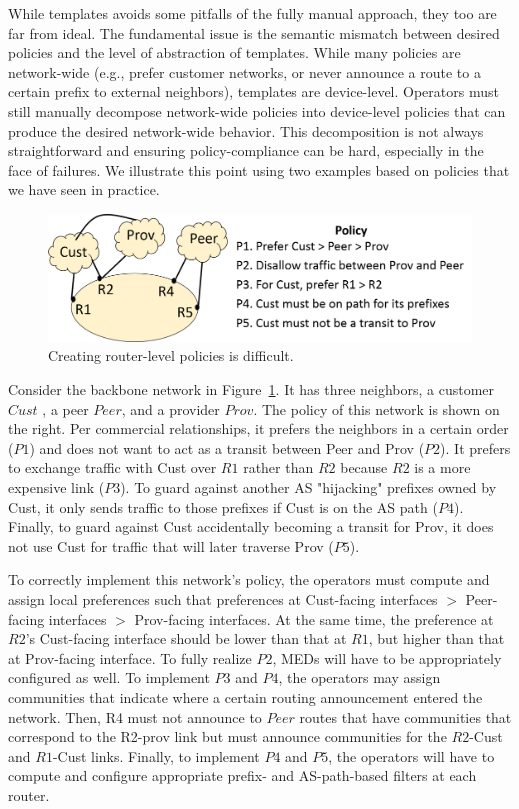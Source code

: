 While templates avoids some pitfalls of the fully manual approach, they too are far from ideal. The fundamental issue is the semantic mismatch between desired policies and the level of abstraction of templates. While many policies are network-wide (e.g., prefer customer networks, or never announce a route to a certain prefix to external neighbors), templates are device-level. Operators must still manually decompose network-wide policies into device-level policies that can produce the desired network-wide behavior.
This decomposition is not always straightforward and ensuring policy-compliance can be hard, especially in the face of failures. We illustrate this point using two examples based on policies that we have seen in practice.

\begin{figure}[t!]
\centering
\includegraphics[width=\columnwidth]{figures/example1}
\caption{Creating router-level policies is difficult.}
\label{fig:example1}
\end{figure}

Consider the backbone network in Figure~\ref{fig:example1}. It has three neighbors, a customer $Cust$ , a peer $Peer$, and a provider $Prov$. The policy of this network is shown on the right. Per commercial relationships, it prefers the neighbors in a certain order ($P1$) and does not want to act as a transit between Peer and Prov ($P2$). It prefers to exchange traffic with Cust over $R1$ rather than $R2$ because $R2$ is a more expensive link ($P3$). To guard against another AS "hijacking" prefixes owned by Cust, it only sends traffic to those prefixes if Cust is on the AS path ($P4$). Finally, to guard against Cust accidentally becoming a transit for Prov, it does not use Cust for traffic that will later traverse Prov ($P5$).

To correctly implement this network's policy, the operators must compute and assign local preferences such that preferences at Cust-facing interfaces $>$ Peer-facing interfaces $>$ Prov-facing interfaces. At the same time, the preference at $R2$'s Cust-facing interface should be lower than that at $R1$, but higher than that at Prov-facing interface. To fully realize $P2$, MEDs will have to be appropriately configured as well. To implement $P3$ and $P4$, the operators may assign communities that indicate where a certain routing announcement entered the network. Then, R4 must not announce to $Peer$ routes that have communities that correspond to the R2-prov link but must announce communities for the $R2$-Cust and $R1$-Cust links. Finally, to implement $P4$ and $P5$, the operators will have to compute and configure appropriate prefix- and AS-path-based filters at each router.

